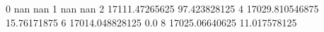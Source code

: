 0 nan nan
1 nan nan
2 17111.47265625 97.423828125
4 17029.810546875 15.76171875
6 17014.048828125 0.0
8 17025.06640625 11.017578125
